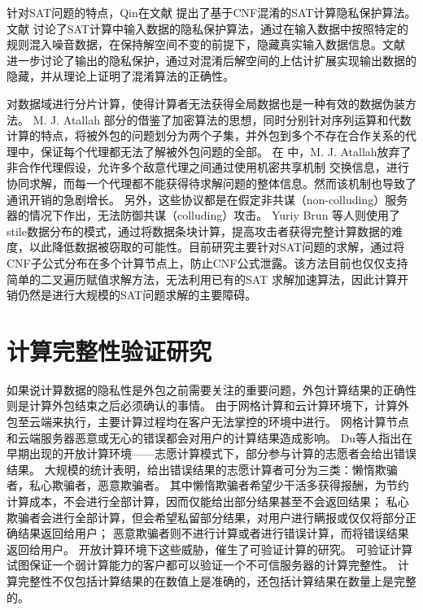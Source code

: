 针对SAT问题的特点，Qin在文献 提出了基于CNF混淆的SAT计算隐私保护算法。文献 讨论了SAT计算中输入数据的隐私保护算法，通过在输入数据中按照特定的规则混入噪音数据，在保持解空间不变的前提下，隐藏真实输入数据信息。文献 进一步讨论了输出的隐私保护，通过对混淆后解空间的上估计扩展实现输出数据的隐藏，并从理论上证明了混淆算法的正确性。

对数据域进行分片计算，使得计算者无法获得全局数据也是一种有效的数据伪装方法。
M. J. Atallah 部分的借鉴了加密算法的思想，同时分别针对序列运算和代数计算的特点，将被外包的问题划分为两个子集，并外包到多个不存在合作关系的代理中，保证每个代理都无法了解被外包问题的全部。
在 中，M. J. Atallah放弃了非合作代理假设，允许多个敌意代理之间通过使用机密共享机制
 交换信息，进行协同求解，而每一个代理都不能获得待求解问题的整体信息。然而该机制也导致了通讯开销的急剧增长。
另外，这些协议都是在假定非共谋（non-colluding）服务器的情况下作出，无法防御共谋（colluding）攻击。
Yuriy Brun 等人则使用了stile数据分布的模式，通过将数据条块计算，提高攻击者获得完整计算数据的难度，以此降低数据被窃取的可能性。目前研究主要针对SAT问题的求解，通过将CNF子公式分布在多个计算节点上，防止CNF公式泄露。该方法目前也仅仅支持简单的二叉遍历赋值求解方法，无法利用已有的SAT 求解加速算法，因此计算开销仍然是进行大规模的SAT问题求解的主要障碍。


\section{计算完整性验证研究}
如果说计算数据的隐私性是外包之前需要关注的重要问题，外包计算结果的正确性则是计算外包结束之后必须确认的事情。
由于网格计算和云计算环境下，计算外包至云端来执行，主要计算过程均在客户无法掌控的环境中进行。
网格计算节点和云端服务器恶意或无心的错误都会对用户的计算结果造成影响。
Du等人指出在早期出现的开放计算环境——志愿计算模式下，部分参与计算的志愿者会给出错误结果。
大规模的统计表明，给出错误结果的志愿计算者可分为三类：懒惰欺骗者，私心欺骗者，恶意欺骗者。
其中懒惰欺骗者希望少干活多获得报酬，为节约计算成本，不会进行全部计算，因而仅能给出部分结果甚至不会返回结果；
私心欺骗者会进行全部计算，但会希望私留部分结果，对用户进行瞒报或仅仅将部分正确结果返回给用户；
恶意欺骗者则不进行计算或者进行错误计算，而将错误结果返回给用户。
开放计算环境下这些威胁，催生了可验证计算的研究。
可验证计算试图保证一个弱计算能力的客户都可以验证一个不可信服务器的计算完整性。
计算完整性不仅包括计算结果的在数值上是准确的，还包括计算结果在数量上是完整的。

